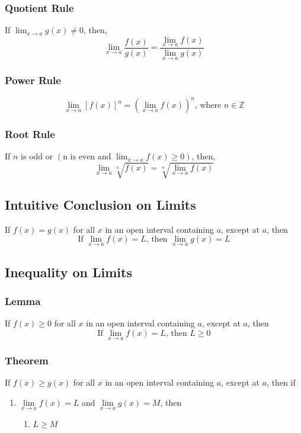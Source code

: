 \documentclass[../ma2002_notes.tex]{subfiles}
\begin{document}
\subsubsection{Quotient Rule}
If \(\displaystyle\lim_{x\to a}g(x)\ne0\), then,
\[\lim_{x\to a}\frac{f(x)}{g(x)} = \frac{\lim \limits_{x\to a}f(x)}{\lim \limits_{x\to a}g(x)}\]

\subsubsection{Power Rule}
\[\lim_{x\to a}[f(x)]^n = \left(\lim_{x\to a}f(x)\right)^n\text{, where }n\in\mathbb{Z}\]

\subsubsection{Root Rule}
If \(n\) is odd or \(\left(\text{n is even and }\displaystyle\lim_{x\to a}f(x)\geq0\right)\), then,
\[\lim_{x\to a}\sqrt[n]{f(x)} = \sqrt[n]{\lim_{x\to a}f(x)}\]

\subsection{Intuitive Conclusion on Limits}
If \(f(x)=g(x)\) for all \(x\) in an open interval containing \(a\), except at \(a\), then
\[\text{If }\lim_{x\to a}f(x)=L\text{, then }\lim_{x\to a}g(x)=L\]

\subsection{Inequality on Limits}
\subsubsection{Lemma}
If \(f(x)\geq0\) for all \(x\) in an open interval containing \(a\), except at \(a\), then
\[\text{If }\lim_{x \to a} f(x)=L\text{, then }L\geq 0\]

\subsubsection{Theorem}
If \(f(x)\geq g(x)\) for all \(x\) in an open interval containing \(a\), except at \(a\), then if
\begin{enumerate}
	\item \(\lim\limits_{x \to a}f(x)=L\) and \(\lim\limits_{x \to a}g(x)=M\), then
	\begin{enumerate}
		\item \(L\geq M\)
	\end{enumerate}
\end{enumerate}
\end{document}
